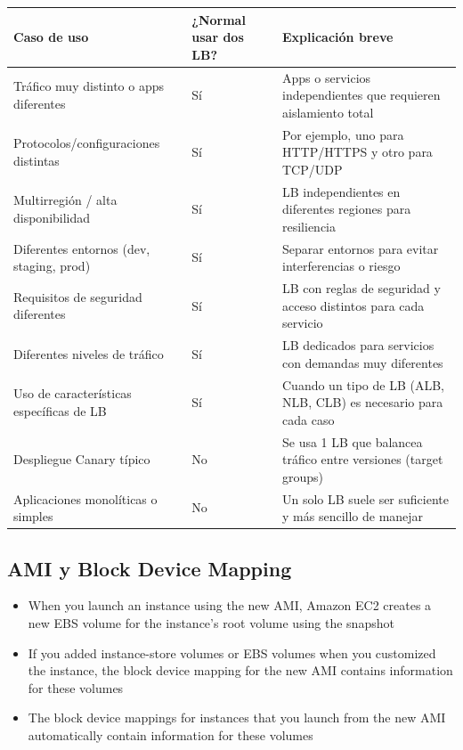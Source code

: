 \documentclass[12pt,a4paper]{report}
\begin{document}
\begin{center}
\begin{longtable}{|p{4cm}|p{2.5cm}|p{6.5cm}|}
\hline
\cellcolor{awsblue!20}\textbf{Caso de uso} & \cellcolor{awsblue!20}\textbf{¿Normal usar dos LB?} & \cellcolor{awsblue!20}\textbf{Explicación breve} \\
\hline
Tráfico muy distinto o apps diferentes & \cellcolor{successgreen!20}Sí & Apps o servicios independientes que requieren aislamiento total \\
\hline
Protocolos/configuraciones distintas & \cellcolor{successgreen!20}Sí & Por ejemplo, uno para HTTP/HTTPS y otro para TCP/UDP \\
\hline
Multirregión / alta disponibilidad & \cellcolor{successgreen!20}Sí & LB independientes en diferentes regiones para resiliencia \\
\hline
Diferentes entornos (dev, staging, prod) & \cellcolor{successgreen!20}Sí & Separar entornos para evitar interferencias o riesgo \\
\hline
Requisitos de seguridad diferentes & \cellcolor{successgreen!20}Sí & LB con reglas de seguridad y acceso distintos para cada servicio \\
\hline
Diferentes niveles de tráfico & \cellcolor{successgreen!20}Sí & LB dedicados para servicios con demandas muy diferentes \\
\hline
Uso de características específicas de LB & \cellcolor{successgreen!20}Sí & Cuando un tipo de LB (ALB, NLB, CLB) es necesario para cada caso \\
\hline
Despliegue Canary típico & \cellcolor{warningyellow!20}No & Se usa 1 LB que balancea tráfico entre versiones (target groups) \\
\hline
Aplicaciones monolíticas o simples & \cellcolor{warningyellow!20}No & Un solo LB suele ser suficiente y más sencillo de manejar \\
\hline
\end{longtable}
\end{center}

\subsection{AMI y Block Device Mapping}

\begin{itemize}
    \item When you launch an instance using the new AMI, Amazon EC2 creates a new EBS volume for the instance's root volume using the snapshot
    \item If you added instance-store volumes or EBS volumes when you customized the instance, the block device mapping for the new AMI contains information for these volumes
    \item The block device mappings for instances that you launch from the new AMI automatically contain information for these volumes
\end{itemize}
\end{document}
